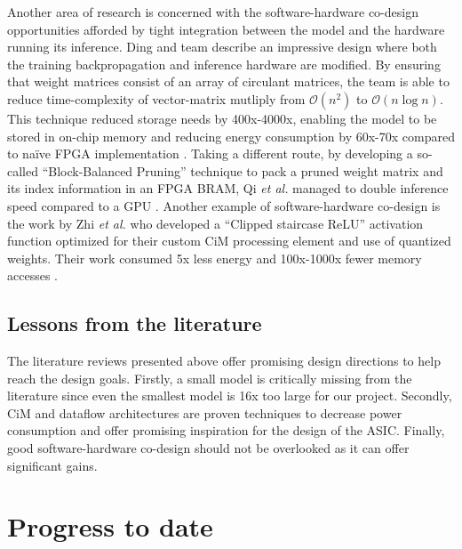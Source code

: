 \documentclass[12pt, hidelinks]{article}
\begin{document}
    Another area of research is concerned with the software-hardware co-design opportunities afforded by tight integration between the model and the hardware running its inference. Ding and team describe an impressive design where both the training backpropagation
    and inference hardware are modified. By ensuring that weight matrices consist of an array of circulant matrices, the team is able to reduce time-complexity of vector-matrix mutliply from $\mathcal{O}(n^2)$ to $\mathcal{O}(n\log{}n)$. This technique reduced
    storage needs by 400x-4000x, enabling the model to be stored in on-chip memory and reducing energy consumption by 60x-70x compared to naïve FPGA implementation \cite*{ding2017circnn}. Taking a different route, by developing a so-called ``Block-Balanced Pruning'' 
    technique to pack a pruned weight matrix and its index information in an FPGA BRAM, Qi \textit{et al.} managed to double inference speed compared to a GPU \cite*{qi2021accommodating}. Another example of software-hardware co-design is the work by Zhi \textit{et al.}
    who developed a ``Clipped staircase ReLU'' activation function optimized for their custom CiM processing element and use of quantized weights. Their work consumed 5x less energy and 100x-1000x fewer memory accesses \cite*{zhi2021opportunities}.

    \subsection{Lessons from the literature}
    The literature reviews presented above offer promising design directions to help reach the design goals. Firstly, a small model is critically missing from the literature since even the smallest model is 16x too large for our project. Secondly, CiM and dataflow architectures
    are proven techniques to decrease power consumption and offer promising inspiration for the design of the ASIC. Finally, good software-hardware co-design should not be overlooked as it can offer significant gains.

    \section{Progress to date}
\end{document}
